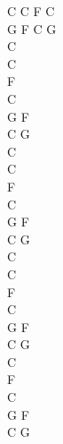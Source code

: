 \documentclass[a5paper, 10pt]{book}
\begin{document}
\begin{minipage}[t]{0.2\textwidth}
  C C F C\\
  G F C G\\

  C\\
  C\\
  F\\
  C\\
  G F\\
  C G\\

  C\\
  C\\
  F\\
  C\\
  G F\\
  C G\\

  C\\
  C\\
  F\\
  C\\
  G F\\
  C G\\

  C\\
  F\\
  C\\
  G F\\
  C G\\
\end{minipage}

\newpage
\end{document}

